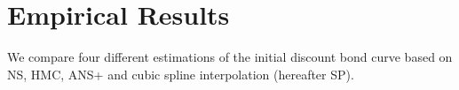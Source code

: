 


\section{Empirical Results}
We compare four different estimations of the initial discount bond
curve based on NS, HMC, ANS+ and cubic spline interpolation (hereafter
SP).

